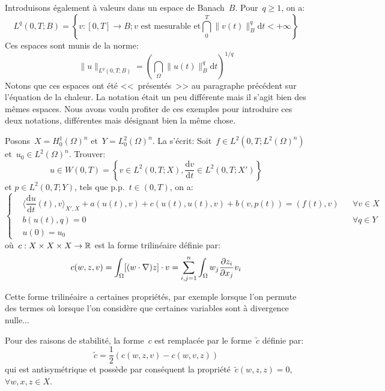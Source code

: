 \medskip
Introduisons également  à valeurs dans un espace
de Banach~$B$. Pour~$q\ge1$, on a:
\begin{equation}
L^q(0,T;B) =\left\{ v: [0,T]\rightarrow B; v \text{ est mesurable et}
\dint_0^T \|v(t)\|^q_B \mathrm dt<+\infty\right\}
\end{equation}
Ces espaces sont munis de la norme:
\begin{equation}
\|u\|_{L^q(0,T;B)} = \left(\dint_\Omega\|u(t)\|^q_B \mathrm dt\right)^{1/q}
\end{equation}
Notons que ces espaces ont été <<~présentés~>> au paragraphe précédent
sur l'équation de la chaleur. La notation était un peu différente mais il s'agit bien
des mêmes espaces. Nous avons voulu profiter de ces exemples pour introduire
ces deux notations, différentes mais désignant bien la même chose.

\medskip
Posons~$X=H^1_0(\Omega)^n$ et~$Y=L^2_0(\Omega)^n$.
\medskip
La  s'écrit: Soit~$f\in L^2(0,T;L^2(\Omega)^n)$ et~$u_0\in L^2(\Omega)^n$.
Trouver:
\begin{equation}u\in W(0,T)=\left\{v\in L^2(0,T;X), \dfrac{\mathrm dv}{\mathrm dt}\in L^2(0,T;X') \right\}\end{equation} et
$p\in L^2(0,T;Y)$, tels que p.p.~$t\in(0,T)$, on a:
\begin{equation}\left\{
\begin{aligned}
&\langle\dfrac{\mathrm du}{\mathrm dt}(t),v\rangle_{X',X}+a(u(t),v)+c(u(t),u(t),v)+b(v,p(t)) = (f(t),v) &&
\forall v\in X\\
&b(u(t),q) =0 &&\forall q \in Y\\
&u(0)=u_0
\end{aligned}\right.
\end{equation}
où~$c: X\times X\times X\rightarrow\mathbb R$ est la forme trilinéaire définie par:
\begin{equation}
c(w,z,v) = \dint_\Omega [(w\cdot\nabla)z]\cdot v %
=\dsum_{i,j=1}^n \dint_\Omega w_j\dfrac{\partial z_i}{\partial x_j} v_i %
\end{equation}

\medskip
Cette forme trilinéaire a certaines propriétés, par exemple lorsque l'on permute
des termes où lorsque l'on considère que certaines variables sont à divergence nulle...

\medskip
Pour des raisons de stabilité, la forme~$c$ est remplacée par le forme~$\tilde{c}$ définie par:
\begin{equation}
\tilde{c} = \dfrac12 \left(c(w,z,v)-c(w,v,z)\right)
\end{equation}
qui est antisymétrique et possède par conséquent la propriété~$\tilde{c}(w,z,z)=0$,
$\forall w,x,z \in X$.

